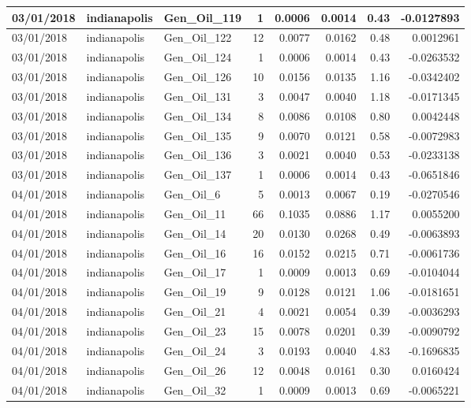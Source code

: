 \documentclass[
  letterpaper,
  DIV=11,
  numbers=noendperiod]{scrartcl}
\begin{document}
\begin{tabular}{l|l|l|r|r|r|r|r}
\hline
03/01/2018 & indianapolis & Gen\_Oil\_119 & 1 & 0.0006 & 0.0014 & 0.43 & -0.0127893\\
\hline
03/01/2018 & indianapolis & Gen\_Oil\_122 & 12 & 0.0077 & 0.0162 & 0.48 & 0.0012961\\
\hline
03/01/2018 & indianapolis & Gen\_Oil\_124 & 1 & 0.0006 & 0.0014 & 0.43 & -0.0263532\\
\hline
03/01/2018 & indianapolis & Gen\_Oil\_126 & 10 & 0.0156 & 0.0135 & 1.16 & -0.0342402\\
\hline
03/01/2018 & indianapolis & Gen\_Oil\_131 & 3 & 0.0047 & 0.0040 & 1.18 & -0.0171345\\
\hline
03/01/2018 & indianapolis & Gen\_Oil\_134 & 8 & 0.0086 & 0.0108 & 0.80 & 0.0042448\\
\hline
03/01/2018 & indianapolis & Gen\_Oil\_135 & 9 & 0.0070 & 0.0121 & 0.58 & -0.0072983\\
\hline
03/01/2018 & indianapolis & Gen\_Oil\_136 & 3 & 0.0021 & 0.0040 & 0.53 & -0.0233138\\
\hline
03/01/2018 & indianapolis & Gen\_Oil\_137 & 1 & 0.0006 & 0.0014 & 0.43 & -0.0651846\\
\hline
04/01/2018 & indianapolis & Gen\_Oil\_6 & 5 & 0.0013 & 0.0067 & 0.19 & -0.0270546\\
\hline
04/01/2018 & indianapolis & Gen\_Oil\_11 & 66 & 0.1035 & 0.0886 & 1.17 & 0.0055200\\
\hline
04/01/2018 & indianapolis & Gen\_Oil\_14 & 20 & 0.0130 & 0.0268 & 0.49 & -0.0063893\\
\hline
04/01/2018 & indianapolis & Gen\_Oil\_16 & 16 & 0.0152 & 0.0215 & 0.71 & -0.0061736\\
\hline
04/01/2018 & indianapolis & Gen\_Oil\_17 & 1 & 0.0009 & 0.0013 & 0.69 & -0.0104044\\
\hline
04/01/2018 & indianapolis & Gen\_Oil\_19 & 9 & 0.0128 & 0.0121 & 1.06 & -0.0181651\\
\hline
04/01/2018 & indianapolis & Gen\_Oil\_21 & 4 & 0.0021 & 0.0054 & 0.39 & -0.0036293\\
\hline
04/01/2018 & indianapolis & Gen\_Oil\_23 & 15 & 0.0078 & 0.0201 & 0.39 & -0.0090792\\
\hline
04/01/2018 & indianapolis & Gen\_Oil\_24 & 3 & 0.0193 & 0.0040 & 4.83 & -0.1696835\\
\hline
04/01/2018 & indianapolis & Gen\_Oil\_26 & 12 & 0.0048 & 0.0161 & 0.30 & 0.0160424\\
\hline
04/01/2018 & indianapolis & Gen\_Oil\_32 & 1 & 0.0009 & 0.0013 & 0.69 & -0.0065221\\

\end{tabular}
\end{document}

